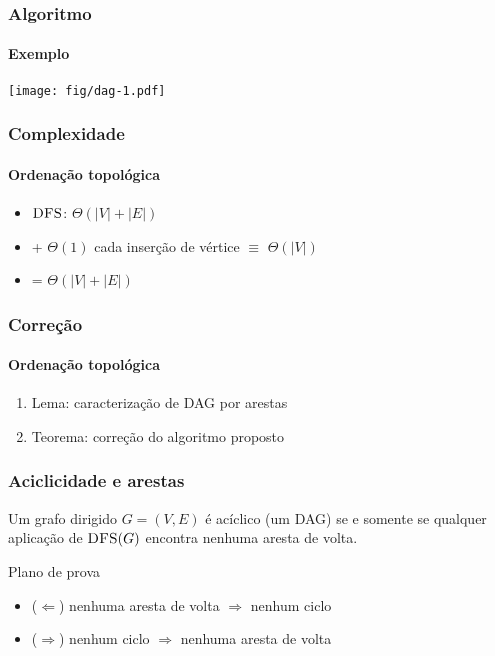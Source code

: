 \documentclass{beamer}
\begin{document}
\begin{frame}
\frametitle{Algoritmo}
\framesubtitle{Exemplo}

\begin{center}
\texttt{[image: fig/dag-1.pdf]}
\end{center}

\end{frame}

\begin{frame}
\frametitle{Complexidade}
\framesubtitle{Ordenação topológica}

\begin{itemize}
\item $\textnormal{\scshape DFS}$: $\Theta(|V|+|E|)$
\item + $\Theta(1)$ cada inserção de vértice $\equiv$ $\Theta(|V|)$
\item = $\Theta(|V|+|E|)$
\end{itemize}
\end{frame}

\begin{frame}
\frametitle{Correção}
\framesubtitle{Ordenação topológica}

\begin{enumerate}
\item Lema: caracterização de DAG por arestas
\item Teorema: correção do algoritmo proposto
\end{enumerate}

\end{frame}

\begin{frame}
\frametitle{Aciclicidade e arestas}

\begin{lemma}
Um grafo dirigido $G = (V, E)$ é acíclico (um DAG) se e somente se qualquer aplicação de $\textnormal{\scshape DFS}(G)$ encontra nenhuma aresta de volta.
\end{lemma}
\pause
Plano de prova
\begin{itemize}
\item ($\Leftarrow$) nenhuma aresta de volta $\Rightarrow$ nenhum ciclo
\item ($\Rightarrow$) nenhum ciclo $\Rightarrow$ nenhuma aresta de volta
\end{itemize}
\end{frame}
\end{document}

